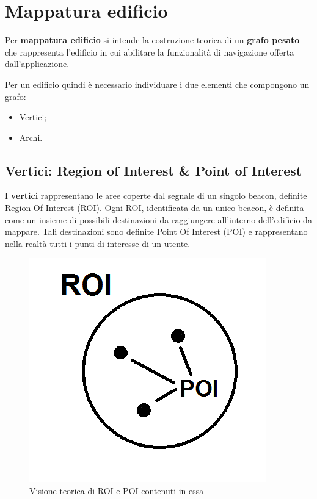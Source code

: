 \documentclass[../ManualeSviluppatore.tex]{subfiles}
\begin{document}
\section{Mappatura edificio}
	Per \textbf{mappatura edificio} si intende la costruzione teorica di un \textbf{grafo pesato} che rappresenta l'edificio in cui abilitare la funzionalità di navigazione offerta dall'applicazione.
	
	Per un edificio quindi è necessario individuare i due elementi che compongono un grafo:
	\begin{itemize}
		\item Vertici;
		\item Archi.
	\end{itemize}
	
	\subsection{Vertici: Region of Interest \& Point of Interest}
	
	I \textbf{vertici} rappresentano le aree coperte dal segnale di un singolo beacon, definite Region Of Interest (ROI).
	Ogni ROI, identificata da un unico beacon, è definita come un insieme di possibili destinazioni da raggiungere all'interno dell'edificio da mappare. Tali destinazioni sono definite Point Of Interest (POI) e rappresentano nella realtà tutti i punti di interesse di un utente.
	
	\begin{figure} [h]
		\centering
		\includegraphics[scale=0.4]{img/ROIePOI}
		\caption{Visione teorica di ROI e POI contenuti in essa}
		\label{fig:ROIePOI}
	\end{figure}
	
\end{document}
